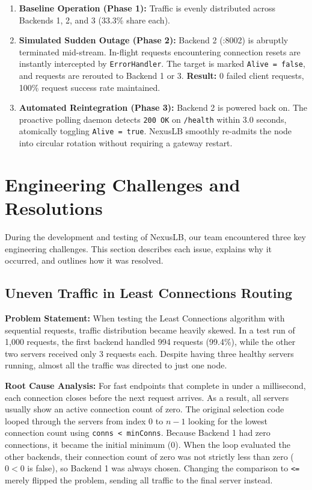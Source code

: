 \documentclass[12pt,openany]{report}
\begin{document}
\begin{enumerate}
  \item \textbf{Baseline Operation (Phase 1):} Traffic is evenly distributed across Backends 1, 2, and 3 (33.3\% share each).
  \item \textbf{Simulated Sudden Outage (Phase 2):} Backend 2 (:8002) is abruptly terminated mid-stream. In-flight requests encountering connection resets are instantly intercepted by \texttt{ErrorHandler}. The target is marked \texttt{Alive = false}, and requests are rerouted to Backend 1 or 3. \textbf{Result:} 0 failed client requests, 100\% request success rate maintained.
  \item \textbf{Automated Reintegration (Phase 3):} Backend 2 is powered back on. The proactive polling daemon detects \texttt{200 OK} on \texttt{/health} within 3.0 seconds, atomically toggling \texttt{Alive = true}. NexusLB smoothly re-admits the node into circular rotation without requiring a gateway restart.
\end{enumerate}

\section{Engineering Challenges and Resolutions}

During the development and testing of NexusLB, our team encountered three key engineering challenges. This section describes each issue, explains why it occurred, and outlines how it was resolved.

\subsection{Uneven Traffic in Least Connections Routing}

\textbf{Problem Statement:} When testing the Least Connections algorithm with sequential requests, traffic distribution became heavily skewed. In a test run of 1,000 requests, the first backend handled 994 requests (99.4\%), while the other two servers received only 3 requests each. Despite having three healthy servers running, almost all the traffic was directed to just one node.

\textbf{Root Cause Analysis:} For fast endpoints that complete in under a millisecond, each connection closes before the next request arrives. As a result, all servers usually show an active connection count of zero. The original selection code looped through the servers from index $0$ to $n-1$ looking for the lowest connection count using \texttt{conns < minConns}. Because Backend 1 had zero connections, it became the initial minimum ($0$). When the loop evaluated the other backends, their connection count of zero was not strictly less than zero ($0 < 0$ is false), so Backend 1 was always chosen. Changing the comparison to \texttt{<=} merely flipped the problem, sending all traffic to the final server instead.
\end{document}
